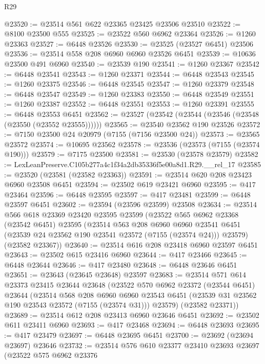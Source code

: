 \begin{lexlean}{R29}
\begin{coremodule}
@23520 := @23514 @561 @622 @23365 @23425 @23506 @23510
@23522 := @8100 @23500 @555
@23525 := @23522 @560 @6962 @23364
@23526 := @1260 @23363
@23527 := @6448 @23526
@23530 := @23525 (@23527 @6451) @23506
@23536 := @23514 @558 @208 @6960 @6960 @23526 @6451
@23539 := @10636 @23500 @491 @6960
@23540 := @23539 @190
@23541 := @1260 @23367
@23542 := @6448 @23541
@23543 := @1260 @23371
@23544 := @6448 @23543
@23545 := @1260 @23375
@23546 := @6448 @23545
@23547 := @1260 @23379
@23548 := @6448 @23547
@23549 := @1260 @23383
@23550 := @6448 @23549
@23551 := @1260 @23387
@23552 := @6448 @23551
@23553 := @1260 @23391
@23555 := @6448 @23553 @6451
@23562 := @23527 (@23542 (@23544 (@23546 (@23548 (@23550 (@23552 @23555))))))
@23565 := @23540 @23562 @190 @23526
@23572 := @7150 @23500 @24 @20979 (@7155 (@7156 @23500 @24))
@23573 := @23565 @23572
@23574 := @10695 @23562
@23578 := @23536 (@23573 (@7155 (@23574 @190)))
@23579 := @7175 @23500
@23581 := @23530 (@23578 @23579)
@23582 := LexLeanPreserve.C105b277a4c1f34a2db35336f5e00a8d1.R29.__rel_17
@23585 := @23520 (@23581 (@23582 @23363))
@23591 := @23514 @620 @208 @23423 @6960 @23508 @6451
@23594 := @23502 @619 @23421 @6960
@23595 := @417 @23464
@23596 := @6448 @23595
@23597 := @417 @23481
@23599 := @6448 @23597 @6451
@23602 := @23594 (@23596 @23599) @23508
@23634 := @23514
    @566
    @618
    @23369
    @23420
    @23595
    @23599
    (@23522
      @565
      @6962
      @23368
      (@23542 @6451)
      @23595
      (@23514
        @563
        @208
        @6960
        @6960
        @23541
        @6451
        (@23539 @24 @23562 @190 @23541 @23572 (@7155 (@23574 @24)))
        @23579)
      (@23582 @23367))
@23640 := @23514 @616 @208 @23418 @6960 @23597 @6451
@23643 := @23502 @615 @23416 @6960
@23644 := @417 @23466
@23645 := @6448 @23644
@23646 := @417 @23480
@23648 := @6448 @23646 @6451
@23651 := @23643 (@23645 @23648) @23597
@23683 := @23514
    @571
    @614
    @23373
    @23415
    @23644
    @23648
    (@23522
      @570
      @6962
      @23372
      (@23544 @6451)
      @23644
      (@23514
        @568
        @208
        @6960
        @6960
        @23543
        @6451
        (@23539 @31 @23562 @190 @23543 @23572 (@7155 (@23574 @31)))
        @23579)
      (@23582 @23371))
@23689 := @23514 @612 @208 @23413 @6960 @23646 @6451
@23692 := @23502 @611 @23411 @6960
@23693 := @417 @23468
@23694 := @6448 @23693
@23695 := @417 @23479
@23697 := @6448 @23695 @6451
@23700 := @23692 (@23694 @23697) @23646
@23732 := @23514
    @576
    @610
    @23377
    @23410
    @23693
    @23697
    (@23522
      @575
      @6962
      @23376

\end{coremodule}
\end{lexlean}
